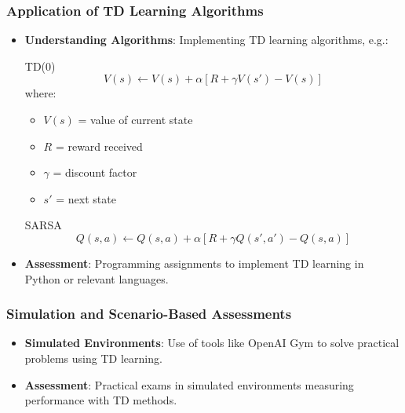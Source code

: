 \documentclass[aspectratio=169]{beamer}
\begin{document}
\begin{frame}[fragile]
    \frametitle{Application of TD Learning Algorithms}
    \begin{itemize}
        \item \textbf{Understanding Algorithms}: Implementing TD learning algorithms, e.g.:
        
        \begin{block}{TD(0)}
            \begin{equation}
            V(s) \leftarrow V(s) + \alpha \left[ R + \gamma V(s') - V(s) \right]
            \end{equation}
            where:
            \begin{itemize}
                \item $V(s)$ = value of current state
                \item $R$ = reward received 
                \item $\gamma$ = discount factor
                \item $s'$ = next state
            \end{itemize}
        \end{block}

        \begin{block}{SARSA}
            \begin{equation}
            Q(s, a) \leftarrow Q(s, a) + \alpha \left[ R + \gamma Q(s', a') - Q(s, a) \right]
            \end{equation}
        \end{block}

        \item \textbf{Assessment}: Programming assignments to implement TD learning in Python or relevant languages.
    \end{itemize}
\end{frame}

\begin{frame}[fragile]
    \frametitle{Simulation and Scenario-Based Assessments}
    \begin{itemize}
        \item \textbf{Simulated Environments}: Use of tools like OpenAI Gym to solve practical problems using TD learning.
        \item \textbf{Assessment}: Practical exams in simulated environments measuring performance with TD methods.
    \end{itemize}
\end{frame}
\end{document}
